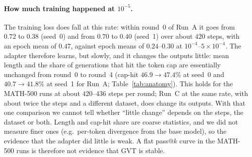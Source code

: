 \documentclass[runningheads]{llncs}
\begin{document}
\paragraph{How much training happened at $10^{-5}$.}
The training loss does fall at this rate: within round~0 of Run~A it goes from
$0.72$ to $0.38$ (seed~0) and from $0.70$ to $0.40$ (seed~1) over about $420$
steps, with an epoch mean of $0.47$, against epoch means of $0.24$--$0.30$ at
$10^{-4}$--$5\times10^{-4}$. The adapter therefore learns, but slowly, and it
changes the outputs little: mean length and the share of generations that hit
the token cap are essentially unchanged from round~0 to round~4 (cap-hit
$46.9\to47.4\%$ at seed~0 and $40.7\to41.8\%$ at seed~1 for Run~A;
Table~\ref{tab:anatomy}). This holds for the MATH-500 runs at about $420$--$436$
steps per round; Run~C at the same rate, with about twice the steps and a
different dataset, does change its outputs. With that one comparison we cannot
tell whether ``little change'' depends on the steps, the dataset or both. Length
and cap-hit share are coarse statistics, and we did not measure finer ones
(e.g.\ per-token divergence from the base model), so the evidence that the
adapter did little is weak. A flat pass@$k$ curve in the MATH-500 runs is
therefore not evidence that GVT is stable.
\end{document}

